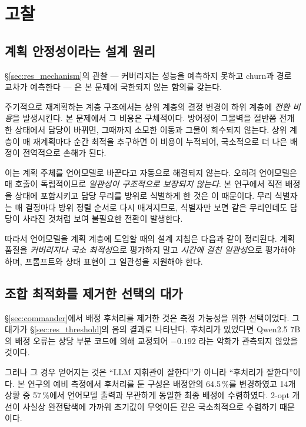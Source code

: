 \section{고찰}
\label{sec:discussion}

\subsection{계획 안정성이라는 설계 원리}

\S\ref{sec:res_mechanism}의 관찰 --- 커버리지는 성능을 예측하지 못하고 churn과 경로 교차가
예측한다 --- 은 본 문제에 국한되지 않는 함의를 갖는다.

주기적으로 재계획하는 계층 구조에서는 상위 계층의 결정 변경이 하위 계층에 \emph{전환 비용}을
발생시킨다. 본 문제에서 그 비용은 구체적이다. 방어정이 그물벽을 절반쯤 전개한 상태에서 담당이
바뀌면, 그때까지 소모한 이동과 그물이 회수되지 않는다. 상위 계층이 매 재계획마다 순간
최적을 추구하면 이 비용이 누적되어, 국소적으로 더 나은 배정이 전역적으로 손해가 된다.

이는 계획 주체를 언어모델로 바꾼다고 자동으로 해결되지 않는다. 오히려 언어모델은 매 호출이
독립적이므로 \emph{일관성이 구조적으로 보장되지 않는다}. 본 연구에서 직전 배정을 상태에
포함시키고 담당 무리를 방위로 식별하게 한 것은 이 때문이다. 무리 식별자는 매 결정마다 방위
정렬 순서로 다시 매겨지므로, 식별자만 보면 같은 무리인데도 담당이 사라진 것처럼 보여 불필요한
전환이 발생한다.

따라서 언어모델을 계획 계층에 도입할 때의 설계 지침은 다음과 같이 정리된다. 계획 품질을
\emph{커버리지나 국소 최적성}으로 평가하지 말고 \emph{시간에 걸친 일관성}으로 평가해야 하며,
프롬프트와 상태 표현이 그 일관성을 지원해야 한다.

\subsection{조합 최적화를 제거한 선택의 대가}

\S\ref{sec:commander}에서 배정 후처리를 제거한 것은 측정 가능성을 위한 선택이었다. 그 대가가
\S\ref{sec:res_threshold}의 음의 결과로 나타난다. 후처리가 있었다면 Qwen2.5 7B의 배정 오류는
상당 부분 코드에 의해 교정되어 $-0.192$ 라는 악화가 관측되지 않았을 것이다.

그러나 그 경우 얻어지는 것은 ``LLM 지휘관이 잘한다''가 아니라 ``후처리가 잘한다''이다.
본 연구의 예비 측정에서 후처리를 둔 구성은 배정안의 64.5\,\%를 변경하였고 14개 상황 중
57\,\%에서 언어모델 출력과 무관하게 동일한 최종 배정에 수렴하였다. 2-opt 개선이 사실상
완전탐색에 가까워 초기값이 무엇이든 같은 국소최적으로 수렴하기 때문이다.

